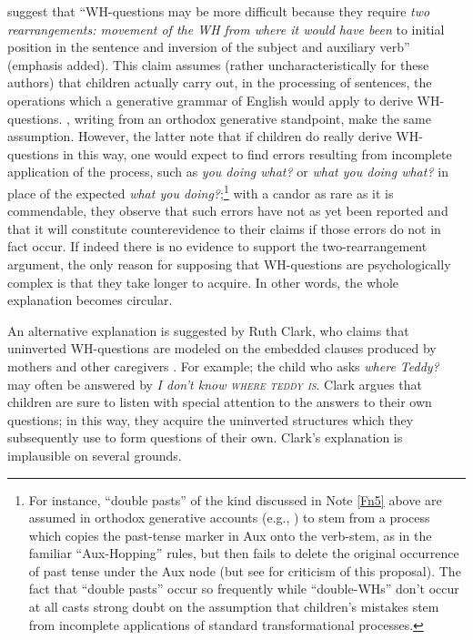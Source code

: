 \citet[354]{ClarkEtAl1977} suggest that ``WH-questions may be more difficult because they require \textit{two rearrangements: movement of the WH from where it would have been} to initial position in the sentence and inversion of the subject and auxiliary verb'' (emphasis added). This claim assumes (rather uncharacteristically for these authors) that children actually carry out, in the processing of sentences, the operations which a generative grammar of English would apply to derive WH-questions. \citet{ErreichEtAl1980}, writing from an orthodox generative standpoint, make the same assumption. However, the latter note that if children do really derive WH-questions in this way, one would expect to find errors resulting from incomplete application of the process, such as \textit{you doing what?} or \textit{what you doing what?} in place of the expected \textit{what you doing?};\footnote{For instance, ``double pasts'' of the kind discussed in Note \ref{Fn5} above are assumed in orthodox generative accounts (e.g., \citealt{Hurford1975}) to stem from a process which copies the past-tense marker in Aux onto the verb-stem, as in the familiar ``Aux-Hopping'' rules, but then fails to delete the original occurrence of past tense under the Aux node (but see \citet{MaratsosEtAl1978} for criticism of this proposal). The fact that ``double pasts'' occur so frequently while ``double-WHs'' don't occur at all casts strong doubt on the assumption that children's mistakes stem from incomplete applications of standard transformational processes.} with a candor as rare as it is commendable, they observe that such errors have not as yet been reported and that it will constitute counterevidence to their claims if those errors do not in fact occur. If indeed there is no evidence to support the two-rearrangement argument, the only reason for supposing that WH-questions are psychologically complex is that they take longer to acquire. In other words, the whole explanation becomes circular.

An alternative explanation is suggested by Ruth Clark, who claims that uninverted WH-questions are modeled on the embedded clauses produced by mothers and other caregivers \citep{Clark1977}. For example; the child who asks \textit{where Teddy?} may often be answered by \textit{I don't know \textsc{where teddy is}}. Clark argues that children are sure to listen with special attention to the answers to their own questions; in this way, they acquire the uninverted structures which they subsequently use to form questions of their own. Clark's explanation is implausible on several grounds.

